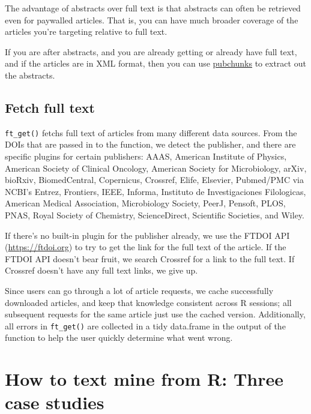 \documentclass[author-year, review, 11pt]{components/elsarticle} %
\begin{document}
The advantage of abstracts over full text is that abstracts can often be
retrieved even for paywalled articles. That is, you can have much
broader coverage of the articles you're targeting relative to full text.

If you are after abstracts, and you are already getting or already have
full text, and if the articles are in XML format, then you can use
\href{https://github.com/ropensci/pubchunks}{pubchunks} to extract out
the abstracts.

\hypertarget{fetch-full-text}{%
\subsection{Fetch full text}\label{fetch-full-text}}

\texttt{ft\_get()} fetchs full text of articles from many different data
sources. From the DOIs that are passed in to the function, we detect the
publisher, and there are specific plugins for certain publishers: AAAS,
American Institute of Physics, American Society of Clinical Oncology,
American Society for Microbiology, arXiv, bioRxiv, BiomedCentral,
Copernicus, Crossref, Elife, Elsevier, Pubmed/PMC via NCBI's Entrez,
Frontiers, IEEE, Informa, Instituto de Investigaciones Filologicas,
American Medical Association, Microbiology Society, PeerJ, Pensoft,
PLOS, PNAS, Royal Society of Chemistry, ScienceDirect, Scientific
Societies, and Wiley.

If there's no built-in plugin for the publisher already, we use the
FTDOI API (\url{https://ftdoi.org}) to try to get the link for the full
text of the article. If the FTDOI API doesn't bear fruit, we search
Crossref for a link to the full text. If Crossref doesn't have any full
text links, we give up.

Since users can go through a lot of article requests, we cache
successfully downloaded articles, and keep that knowledge consistent
across R sessions; all subsequent requests for the same article just use
the cached version. Additionally, all errors in \texttt{ft\_get()} are
collected in a tidy data.frame in the output of the function to help the
user quickly determine what went wrong.

\hypertarget{how-to-text-mine-from-r-three-case-studies}{%
\section{How to text mine from R: Three case
studies}\label{how-to-text-mine-from-r-three-case-studies}}
\end{document}
